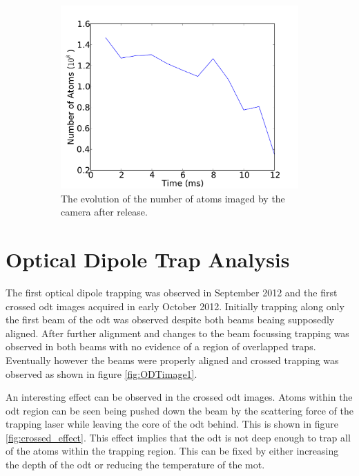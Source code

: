 \begin{figure}
\begin{subfigure}[b]{0.6\textwidth}
    \includegraphics[width=\textwidth]{figs/MOT_atom_count.pdf}
    \caption{The evolution of the number of atoms imaged by the camera after release.}
    \label{fig:mot_atom_count}
    \end{subfigure}
    \caption{}
\end{figure}

\section{Optical Dipole Trap Analysis}
The first optical dipole trapping was observed in September 2012 and the first crossed \gls{odt} images acquired in early October 2012. Initially trapping along only the first beam of the \gls{odt} was observed despite both beams beaing supposedly aligned. After further alignment and changes to the beam focussing trapping was observed in both beams with no evidence of a region of overlapped traps. Eventually however the beams were properly aligned and crossed trapping was observed as shown in figure \ref{fig:ODTimage1}.

An interesting effect can be observed in the crossed \gls{odt} images. Atoms within the \gls{odt} region can be seen being pushed down the beam by the scattering force of the trapping laser while leaving the core of the \gls{odt} behind. This is shown in figure \ref{fig:crossed_effect}. This effect implies that the \gls{odt} is not deep enough to trap all of the atoms within the trapping region. This can be fixed by either increasing the depth of the \gls{odt} or reducing the temperature of the \gls{mot}.

